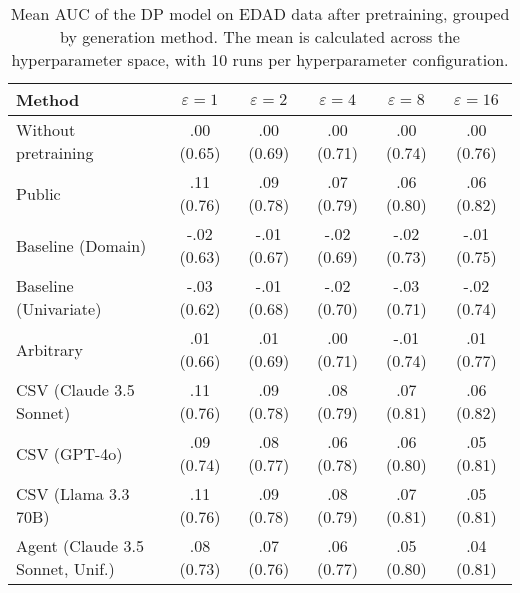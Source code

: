 \begin{table}[h!]
    \centering
    \caption{Mean AUC of the DP model on EDAD data after pretraining, grouped by generation method. The mean is calculated across the hyperparameter space, with 10 runs per hyperparameter configuration.}
    \label{tab:epsilon_comparison}
    \begin{tabular}{lccccc}
    \toprule
    Method & $\varepsilon=1$ & $\varepsilon=2$ & $\varepsilon=4$ & $\varepsilon=8$ & $\varepsilon=16$ \\
    \midrule
    Without pretraining & .00 {\small (0.65)} & .00 {\small (0.69)} & .00 {\small (0.71)} & .00 {\small (0.74)} & .00 {\small (0.76)} \\
    \arrayrulecolor{black!50!}\midrule
    Public & \cellcolor{bronze!30}.11 {\small (0.76)} & \cellcolor{bronze!30}.09 {\small (0.78)} & \cellcolor{bronze!30}.07 {\small (0.79)} & \cellcolor{bronze!30}.06 {\small (0.80)} & \cellcolor{gold!30}.06 {\small (0.82)} \\
    \arrayrulecolor{black!50!}\midrule
    Baseline (Domain) & -.02 {\small (0.63)} & -.01 {\small (0.67)} & -.02 {\small (0.69)} & -.02 {\small (0.73)} & -.01 {\small (0.75)} \\
    Baseline (Univariate) & -.03 {\small (0.62)} & -.01 {\small (0.68)} & -.02 {\small (0.70)} & -.03 {\small (0.71)} & -.02 {\small (0.74)} \\
    \arrayrulecolor{black!50!}\midrule
    Arbitrary & .01 {\small (0.66)} & .01 {\small (0.69)} & .00 {\small (0.71)} & -.01 {\small (0.74)} & .01 {\small (0.77)} \\
    \arrayrulecolor{black!50!}\midrule
    CSV (Claude 3.5 Sonnet) & \cellcolor{gold!30}.11 {\small (0.76)} & \cellcolor{gold!30}.09 {\small (0.78)} & \cellcolor{silver!30}.08 {\small (0.79)} & \cellcolor{silver!30}.07 {\small (0.81)} & \cellcolor{silver!30}.06 {\small (0.82)} \\
    CSV (GPT-4o) & .09 {\small (0.74)} & .08 {\small (0.77)} & .06 {\small (0.78)} & .06 {\small (0.80)} & .05 {\small (0.81)} \\
    CSV (Llama 3.3 70B) & \cellcolor{silver!30}.11 {\small (0.76)} & \cellcolor{silver!30}.09 {\small (0.78)} & \cellcolor{gold!30}.08 {\small (0.79)} & \cellcolor{gold!30}.07 {\small (0.81)} & \cellcolor{bronze!30}.05 {\small (0.81)} \\
    \arrayrulecolor{black!50!}\midrule
    Agent (Claude 3.5 Sonnet, Unif.) & .08 {\small (0.73)} & .07 {\small (0.76)} & .06 {\small (0.77)} & .05 {\small (0.80)} & .04 {\small (0.81)} \\

\end{tabular}
\end{table}
